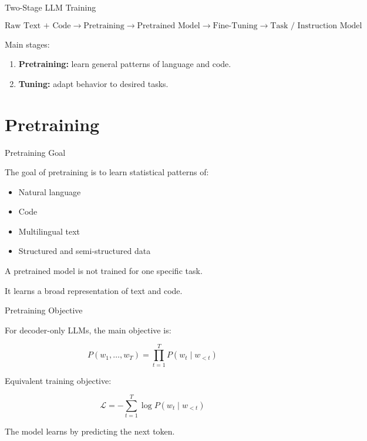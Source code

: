 \documentclass[aspectratio=169]{beamer}
\begin{document}
\begin{frame}{Two-Stage LLM Training}

\[
\text{Raw Text + Code}
\rightarrow
\text{Pretraining}
\rightarrow
\text{Pretrained Model}
\rightarrow
\text{Fine-Tuning}
\rightarrow
\text{Task / Instruction Model}
\]

\vspace{0.5cm}

Main stages:

\begin{enumerate}
    \item \textbf{Pretraining:} learn general patterns of language and code.
    \item \textbf{Tuning:} adapt behavior to desired tasks.
\end{enumerate}

\end{frame}

\section{Pretraining}

\begin{frame}{Pretraining Goal}

The goal of pretraining is to learn statistical patterns of:

\begin{itemize}
    \item Natural language
    \item Code
    \item Multilingual text
    \item Structured and semi-structured data
\end{itemize}

\vspace{0.5cm}

A pretrained model is not trained for one specific task.

\vspace{0.3cm}

It learns a broad representation of text and code.

\end{frame}

\begin{frame}{Pretraining Objective}

For decoder-only LLMs, the main objective is:

\[
P(w_1,\ldots,w_T)
=
\prod_{t=1}^{T}
P(w_t \mid w_{<t})
\]

\vspace{0.5cm}

Equivalent training objective:

\[
\mathcal{L}
=
-
\sum_{t=1}^{T}
\log P(w_t \mid w_{<t})
\]

\vspace{0.4cm}

The model learns by predicting the next token.

\end{frame}
\end{document}
